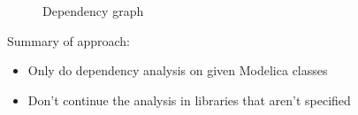\documentclass{cslthse-msc}
\begin{document}
\begin{figure}[H]
    \centering
    \caption{Dependency graph}
    \label{fig:libraryGraph}
\end{figure}

Summary of approach:
\begin{itemize}
	\item Only do dependency analysis on given Modelica classes
	\item Don't continue the analysis in libraries that aren't specified
\end{itemize}
\end{document}
